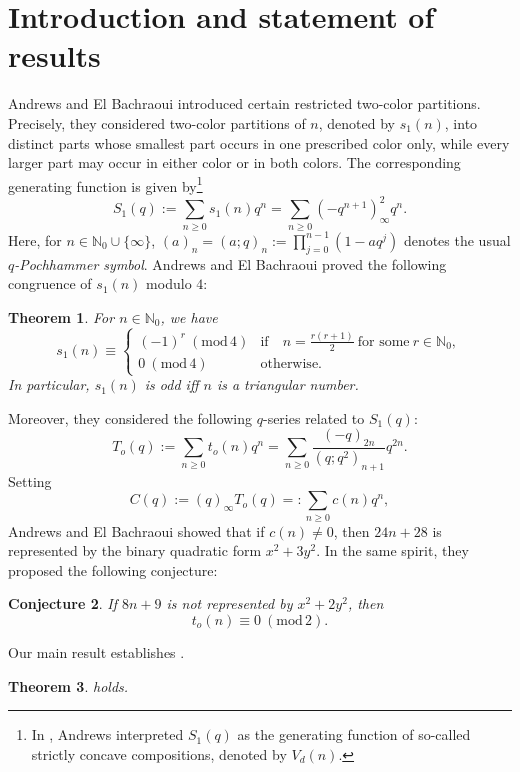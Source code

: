 \documentclass[10pt,a4paper]{amsart}
\renewcommand{\(}{\left\(}
\renewcommand{\)}{\right\)}
\numberwithin{equation}{section}
\newtheorem{theorem}{Theorem}[section]
\newtheorem{conjecture}[theorem]{Conjecture}
\numberwithin{equation}{section}
\renewcommand{\pmod}[1]{\ \left( \mathrm{mod} \, #1 \right)}
\begin{document}
\section{Introduction and statement of results}
  Andrews and El Bachraoui \cite{AB} introduced certain restricted two-color partitions. Precisely, they considered two-color partitions of $n$, denoted by $s_1(n)$, into distinct parts whose smallest part occurs in one prescribed color only, while every larger part may occur in either color or in both colors. The corresponding generating function is given by\footnote{In \cite[p. 68]{AndCC}, Andrews interpreted $S_1(q)$ as the generating function of so-called strictly concave compositions, denoted by $V_d(n)$.} 
\[
S_1(q):=\sum_{n\ge 0}s_1(n)q^n=\sum_{n\ge 0}\left(-q^{n+1}\right)^2_{\infty}q^n.
\]
Here, for $n\in \mathbb{N}_0\cup \{\infty\}$, $(a)_n=(a;q)_n:=\prod_{j=0}^{n-1}(1-aq^j)$ denotes the usual {\it $q$-Pochhammer symbol}. Andrews and El Bachraoui \cite[Theorem 1]{AB} proved the following congruence of $s_1(n)$ modulo $4$:
\begin{theorem}
For $n\in \mathbb{N}_0$, we have
\[
s_1(n)\equiv \begin{cases}
(-1)^r\pmod{4} &\text{if}\quad n=\frac{r(r+1)}{2}\ \text{for some}\ r\in \mathbb{N}_0,\\
0\pmod{4} &\text{otherwise}.
\end{cases}
\]
In particular, $s_1(n)$ is odd iff $n$ is a triangular number.
\end{theorem} 
Moreover, they \cite[p. 2]{AB} considered the following $q$-series related to $S_1(q)$: 
\begin{equation}\label{A}
T_o(q):=\sum_{n\ge 0}t_o(n)q^n=\sum_{n\ge 0}\frac{(-q)_{2n}}{\left(q;q^2\right)_{n+1}}q^{2n}.
\end{equation}
Setting
\begin{equation}\label{B}
C(q):=(q)_{\infty}T_o(q)=:\sum_{n\ge 0}c(n)q^n,
\end{equation}
Andrews and El Bachraoui \cite[Theorem 3]{AB} showed that if $c(n)\neq 0$, then $24n+28$ is represented by the binary quadratic form $x^2+3y^2$. In the same spirit, they \cite[Conjecture 2]{AB} proposed the following conjecture:
\begin{conjecture}\label{conj2}
	If $8n+9$ is not represented by $x^2+2y^2$, then
	\[
	t_o(n)\equiv 0\pmod{2}.
	\]	
\end{conjecture}
Our main result establishes .%

\begin{theorem}\label{thm}
  holds. 
\end{theorem}
\end{document}
